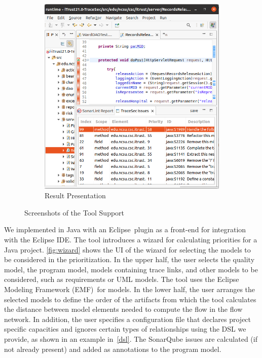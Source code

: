 \begin{figure}
    \begin{subfigure}{.61\columnwidth}
    \includegraphics[width=\columnwidth]{figures/tracesec-impl-results.png}
    \caption{Result Presentation}
    \label{fig:results}
    \end{subfigure}
    \caption{Screenshots of the Tool Support}
    \label{fig:impl}
\end{figure}

We implemented \appr{} in Java with an Eclipse\,\cite{eclipse} plugin as a front-end for integration with the Eclipse IDE.
The tool introduces a wizard for calculating priorities for a Java project.
\autoref{fig:wizard} shows the UI of the wizard for selecting the models to be considered in the prioritization.
In the upper half, the user selects the quality model, the program model, models containing trace links, and other models to be considered, such as requirements or UML models.
The tool uses the Eclipse Modeling Framework (EMF)\,\cite{steinberg2008emf} for models.
In the lower half, the user arranges the selected models to define the order of the artifacts from which the tool calculates the distance between model elements needed to compute the flow in the flow network. In addition, the user specifies a configuration file that declares project specific capacities and ignores certain types of relationships using the DSL we provide, as shown in an example in~\autoref{dsl}.
The SonarQube issues are calculated (if not already present) and added as annotations to the program model.

